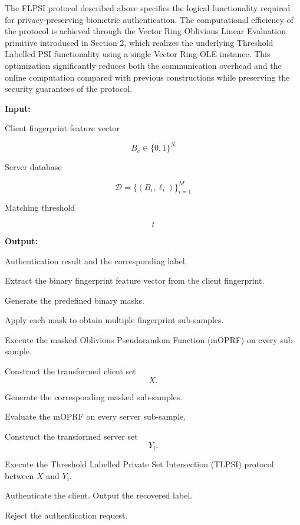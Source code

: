 \documentclass[11pt,a4paper]{article}
\begin{document}
The FLPSI protocol described above specifies the logical functionality required for privacy-preserving biometric authentication. The computational efficiency of the protocol is achieved through the Vector Ring Oblivious Linear Evaluation primitive introduced in Section 2, which realizes the underlying Threshold Labelled PSI functionality using a single Vector Ring-OLE instance. This optimization significantly reduces both the communication overhead and the online computation compared with previous constructions while preserving the security guarantees of the protocol.
\begin{algorithm}[H]
\caption{Fuzzy Labelled Private Set Intersection (FLPSI)}
\label{alg:flpsi}

\textbf{Input:}

Client fingerprint feature vector

\[
B_c \in \{0,1\}^{N}
\]

Server database

\[
\mathcal{D}=\{(B_i,\ell_i)\}_{i=1}^{M}
\]

Matching threshold

\[
t
\]

\textbf{Output:}

Authentication result and the corresponding label.

\begin{algorithmic}[1]

\State Extract the binary fingerprint feature vector from the client fingerprint.

\State Generate the predefined binary masks.

\State Apply each mask to obtain multiple fingerprint sub-samples.

\State Execute the masked Oblivious Pseudorandom Function (mOPRF) on every sub-sample.

\State Construct the transformed client set
\[
X.
\]


    \State Generate the corresponding masked sub-samples.

    \State Evaluate the mOPRF on every server sub-sample.

    \State Construct the transformed server set
    \[
    Y_i.
    \]

    \State Execute the Threshold Labelled Private Set Intersection (TLPSI)
    protocol between $X$ and $Y_i$.

        \State Authenticate the client.
        \State Output the recovered label.
        \State \Return
    \EndIf

\EndFor

\State Reject the authentication request.

\end{algorithmic}
\end{algorithm}
\end{document}
